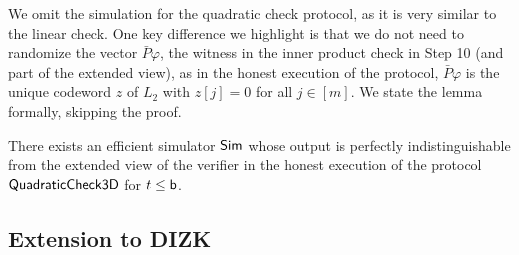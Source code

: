 We omit the simulation for the quadratic check protocol, as it is very similar
to the linear check. One key difference we highlight is that we do not need to
randomize the vector $\bar{P}\varphi$, the witness in the inner product check in
Step 10 (and part of the extended view), as in the honest execution of the
protocol, $\bar{P}\varphi$ is the unique codeword $z$ of $L_2$ with $z[j]=0$ for
all $j\in [m]$. We state the lemma formally, skipping the proof.

\begin{lemma}\label{lem:simquadcheck}
There exists an efficient simulator $\mathsf{Sim}$ whose output is perfectly
indistinguishable from the extended view of the verifier in the honest execution
of the protocol $\mathsf{QuadraticCheck3D}$ for $t\leq \mathsf{b}$.
\end{lemma}


\subsection{Extension to DIZK}


